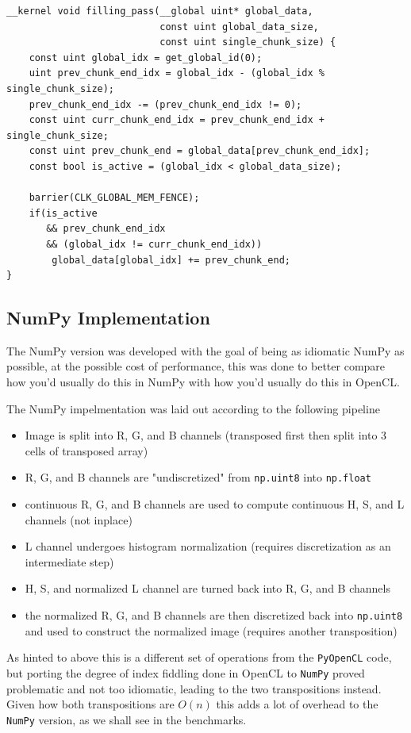 \documentclass[11pt]{article}
\begin{document}
\begin{verbatim}
__kernel void filling_pass(__global uint* global_data,
                           const uint global_data_size,
                           const uint single_chunk_size) {
    const uint global_idx = get_global_id(0);
    uint prev_chunk_end_idx = global_idx - (global_idx % single_chunk_size);
    prev_chunk_end_idx -= (prev_chunk_end_idx != 0);
    const uint curr_chunk_end_idx = prev_chunk_end_idx + single_chunk_size;
    const uint prev_chunk_end = global_data[prev_chunk_end_idx];
    const bool is_active = (global_idx < global_data_size);

    barrier(CLK_GLOBAL_MEM_FENCE);
    if(is_active
       && prev_chunk_end_idx
       && (global_idx != curr_chunk_end_idx))
        global_data[global_idx] += prev_chunk_end;
}
\end{verbatim}
\subsection{NumPy Implementation}
\label{sec:orgee24227}
The NumPy version was developed with the goal of being as idiomatic NumPy as possible, at the possible cost of performance, this was done to better compare how you'd usually do this in NumPy with how you'd usually do this in OpenCL.

The NumPy impelmentation was laid out according to the following pipeline
\begin{itemize}
\item Image is split into R, G, and B channels (transposed first then split into 3 cells of transposed array)
\item R, G, and B channels are "undiscretized" from \texttt{np.uint8} into \texttt{np.float}
\item continuous R, G, and B channels are used to compute continuous H, S, and L channels (not inplace)
\item L channel undergoes histogram normalization (requires discretization as an intermediate step)
\item H, S, and normalized L channel are turned back into R, G, and B channels
\item the normalized R, G, and B channels are then discretized back into \texttt{np.uint8} and used to construct the normalized image (requires another transposition)
\end{itemize}

As hinted to above this is a different set of operations from the \texttt{PyOpenCL} code, but porting the degree of index fiddling done in OpenCL to \texttt{NumPy} proved problematic and not too idiomatic, leading to the two transpositions instead. Given how both transpositions are \(O(n)\) this adds a lot of overhead to the \texttt{NumPy} version, as we shall see in the benchmarks.
\end{document}
